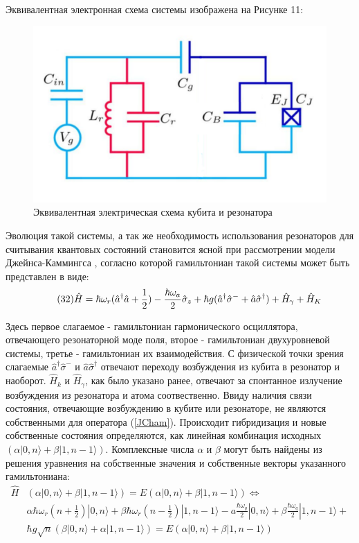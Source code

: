 Эквивалентная электронная схема системы изображена на Рисунке 11:
\begin{figure}[!h]
	\centering
	\includegraphics[width=0.5\linewidth]{pictures/electr}
	\caption{Эквивалентная электрическая схема кубита и резонатора}
	\label{fig:electr}
\end{figure}

Эволюция такой системы, а так же необходимость использования резонаторов для считывания квантовых состояний становится ясной при рассмотрении модели Джейнса-Каммингса \cite{Clarke2008}, согласно которой гамильтониан такой системы может быть представлен в виде:
\begin{equation}
\label{JCham}
\tag{32}
\hat H = \hbar\omega_r(\hat a ^\dagger \hat a +\frac{1}{2})-\frac{\hbar\omega_a}{2}\hat \sigma_z + \hbar g(\hat a^\dagger\hat\sigma^-+ \hat a\hat\sigma^\dagger) + \hat H_\gamma + \hat H_K
\\
\end{equation}

Здесь первое слагаемое - гамильтониан гармонического осциллятора, отвечающего резонаторной моде поля, второе - гамильтониан двухуровневой системы, третье - гамильтониан их взаимодействия. С физической точки зрения слагаемые $\hat a^\dagger\hat\sigma^-$  и $\hat a \hat\sigma^\dagger$ отвечают переходу возбуждения из кубита в резонатор и наоборот. $\hat H_k $ и $\hat H_\gamma$, как было указано ранее, отвечают за спонтанное излучение возбуждения из резонатора и атома соотвественно. Ввиду наличия связи состояния, отвечающие возбуждению в кубите или резонаторе, не являются собственными для оператора (\ref{JCham}). Происходит гибридизация и новые собственные состояния определяются, как линейная комбинация исходных $(\alpha|0,n\rangle+\beta|1,n-1\rangle)$.
Комплексные числа $\alpha$  и $\beta$ могут быть найдены из решения уравнения на собственные значения и собственные векторы указанного гамильтониана:
\begin{equation}
\tag{33}
\begin{split} 
\hat H &(\alpha|0,n\rangle+\beta|1,n-1\rangle) = E (\alpha|0,n\rangle+\beta|1,n-1\rangle) \iff\\
&\alpha\hbar\omega_r(n+\frac{1}{2})|0,n\rangle+\beta\hbar\omega_r(n-\frac{1}{2})|1,n-1\rangle - a\frac{\hbar\omega_q}{2}|0,n\rangle+\beta\frac{\hbar\omega_q}{2}|1,n-1\rangle + \\&\hbar g\sqrt{n}(\beta|0,n\rangle+\alpha|1,n-1\rangle)= E(\alpha|0,n\rangle+\beta|1,n-1\rangle)
\\
\end{split}
\end{equation}

